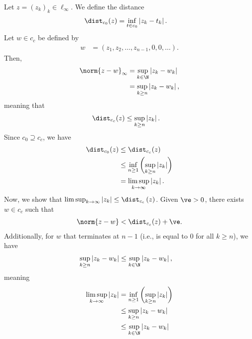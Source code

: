 \documentclass[10pt]{mypackage}
\begin{document}
\begin{solution}
  Let $z = \left(z_k\right)_k\in \ell_{\infty}$. We define the distance
  \begin{align*}
    \dist_{c_0}(z) &= \inf_{t\in c_0}\left\vert z_k - t_k \right\vert.
  \end{align*}
  Let $w\in c_c$ be defined by
  \begin{align*}
    w &= \left(z_1,z_2,\dots,z_{n-1},0,0,\dots\right).
  \end{align*}
  Then,
  \begin{align*}
    \norm{z-w}_{\infty} &= \sup_{k\in \N}\left\vert z_k - w_k \right\vert\\
                        &= \sup_{k\geq n}\left\vert z_k - w_k \right\vert,
  \end{align*}
  meaning that
  \begin{align*}
    \dist_{c_c}(z) &\leq \sup_{k\geq n}\left\vert z_k \right\vert.
  \end{align*}
  Since $c_0 \supseteq c_c$, we have
  \begin{align*}
    \dist_{c_0}(z) &\leq \dist_{c_c}(z)\\
                   &\leq \inf_{n\geq 1}\left(\sup_{k\geq n}\left\vert z_k \right\vert\right)\\
                   &= \limsup_{k\rightarrow\infty}\left\vert z_k \right\vert.
  \end{align*}
  Now, we show that $\limsup_{k\rightarrow\infty}\left\vert z_k \right\vert \leq \dist_{c_c}\left(z\right)$. Given $\ve > 0$, there exists $w\in c_c$ such that
  \begin{align*}
    \norm{z-w} < \dist_{c_c}(z) + \ve.
  \end{align*}
  Additionally, for $w$ that terminates at $n-1$ (i.e., is equal to $0$ for all $k\geq n$), we have
  \begin{align*}
    \sup_{k\geq n}\left\vert z_k-w_k \right\vert &\leq \sup_{k\in \N}\left\vert z_k - w_k \right\vert,
  \end{align*}
  meaning
  \begin{align*}
    \limsup_{k\rightarrow\infty}\left\vert z_k \right\vert &= \inf_{n\geq 1}\left(\sup_{k\geq n}\left\vert z_k \right\vert\right)\\
                                                         &\leq \sup_{k\geq n}\left\vert z_k - w_k \right\vert\\
                                                         &\leq \sup_{k\in \N}\left\vert z_k - w_k \right\vert\\

\end{align*}
\end{solution}
\end{document}

